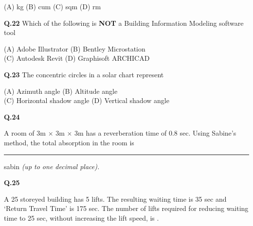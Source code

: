\documentclass{article}
\begin{document}
\begin{flushleft}
\hspace{1.8cm}(A) kg \hspace{1.8cm} (B) cum 
\hspace{1.8cm}(C) sqm \hspace{1.8cm} (D) rm 
\end{flushleft}

\vspace{0.5cm}

\textbf{Q.22} \hspace{0.3cm} Which of the following is \textbf{NOT} a Building Information Modeling software tool

\begin{flushleft}  
    \hspace{1.8cm} (A) Adobe Illustrator \hspace{2.1cm}   (B) Bentley Microstation\\ 
    \hspace{1.8cm} (C) Autodesk Revit  \hspace{2.365cm} (D) Graphisoft ARCHICAD 
\end{flushleft}

\vspace{0.5cm}

\textbf{Q.23} \hspace{0.3cm} The concentric circles in a solar chart represent

\begin{flushleft}
    

\hspace{1.8cm}  (A) Azimuth angle \hspace{2.6cm} (B) Altitude angle \\
\hspace{1.8cm}  (C) Horizontal shadow angle \hspace{1.09cm} (D) Vertical shadow angle 
\end{flushleft}
\vspace{0.5cm}

\textbf{Q.24} \hspace{0.3cm} \parbox[t]{14cm}{ A room of 3m $\times$ 3m $\times$ 3m has a reverberation time of 0.8 sec. Using Sabine’s method, the total absorption in the room is \rule{4cm}{0.15mm} sabin \textit{(up to one decimal place).} }

\vspace*{1cm} 

\noindent
\hspace{0.6cm}\textbf{Q.25} \hspace{0.3cm} \parbox[t]{14 cm }{
A 25 storeyed building has 5 lifts. The resulting waiting time is 35 sec and `Return Travel Time' is 175 sec. The number of lifts required for reducing waiting time to 25 sec, without increasing the lift speed, is \underline{\hspace{3cm}}.}
\vspace{1.5cm}
\end{document}
